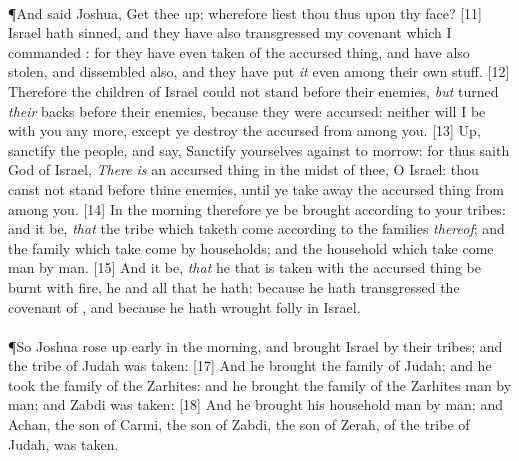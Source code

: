 \\
\P \textcolor[cmyk]{0.99998,1,0,0}{And  said  Joshua, Get thee up; wherefore liest thou thus upon thy face?}
[11] \textcolor[cmyk]{0.99998,1,0,0}{Israel hath sinned, and they have also transgressed my covenant which I commanded : for they have even taken of the accursed thing, and have also stolen, and dissembled also, and they have put \emph{it} even among their own stuff.}
[12] \textcolor[cmyk]{0.99998,1,0,0}{Therefore the children of Israel could not stand before their enemies, \emph{but} turned \emph{their} backs before their enemies, because they were accursed: neither will I be with you any more, except ye destroy the accursed from among you.}
[13] \textcolor[cmyk]{0.99998,1,0,0}{Up, sanctify the people, and say, Sanctify yourselves against to morrow: for thus saith  God of Israel, \emph{There} \emph{is} an accursed thing in the midst of thee, O Israel: thou canst not stand before thine enemies, until ye take away the accursed thing from among you.}
[14] \textcolor[cmyk]{0.99998,1,0,0}{In the morning therefore ye  be brought according to your tribes: and it  be, \emph{that} the tribe which  taketh  come according to the families \emph{thereof}; and the family which   take  come by households; and the household which   take  come man by man.}
[15] \textcolor[cmyk]{0.99998,1,0,0}{And it  be, \emph{that} he that is taken with the accursed thing  be burnt with fire, he and all that he hath: because he hath transgressed the covenant of , and because he hath wrought folly in Israel.}\\
\\
\P \textcolor[cmyk]{0.99998,1,0,0}{So Joshua rose up early in the morning, and brought Israel by their tribes; and the tribe of Judah was taken:}
[17] \textcolor[cmyk]{0.99998,1,0,0}{And he brought the family of Judah; and he took the family of the Zarhites: and he brought the family of the Zarhites man by man; and Zabdi was taken:}
[18] \textcolor[cmyk]{0.99998,1,0,0}{And he brought his household man by man; and Achan, the son of Carmi, the son of Zabdi, the son of Zerah, of the tribe of Judah, was taken.}
